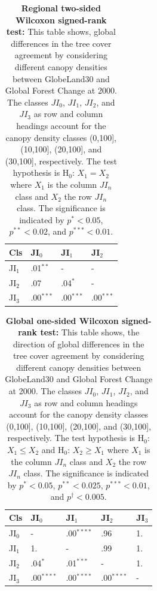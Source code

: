 			\begin{table}[ht]
				\centering
				\caption[Global two-sided Wilcoxon signed-rank test]{\textbf{Regional two-sided Wilcoxon signed-rank test:} This table shows, global differences in the tree cover agreement by considering different canopy densities between GlobeLand30 and Global Forest Change at 2000. The classes $JI_0$, $JI_1$, $JI_2$, and $JI_3$ as row and column headings account for the canopy density classes (0,100], (10,100], (20,100], and (30,100], respectively. The test hypothesis is H$_0$: $X_1=X_2$ where $X_1$ is the column $JI_n$ class and $X_2$ the row $JI_n$ class. The significance is indicated by $p^{*}<0.05$, $p^{**}<0.02$, and $p^{***}<0.01$.}
				\label{tab:wilcoxontwosided_all}
				\begin{tabular}{llll}
					\hline
					Cls & JI$_0$ & JI$_1$ & JI$_2$ \\\hline
					JI$_1$ & .01$^{**}$ & - & - \\
					JI$_2$ & .07 & .04$^{*}$ & - \\
					JI$_3$ & .00$^{***}$ & .00$^{***}$ & .00$^{***}$ \\\hline
				\end{tabular}
			\end{table}
			\begin{table}[ht]
				\centering
				\caption[Global one-sided Wilcoxon signed-rank test]{\textbf{Global one-sided Wilcoxon signed-rank test:} This table shows, the direction of global differences in the tree cover agreement by considering different canopy densities between GlobeLand30 and Global Forest Change at 2000. The classes $JI_0$, $JI_1$, $JI_2$, and $JI_3$ as row and column headings account for the canopy density classes (0,100], (10,100], (20,100], and (30,100], respectively. The test hypothesis is H$_0$: $X_1\leq X_2$ and H$_0$: $X_2\geq X_1$ where $X_1$ is the column $JI_n$ class and $X_2$ the row $JI_n$ class. The significance is indicated by $p^{*}<0.05$, $p^{**}<0.025$, $p^{***}<0.01$, and $p^{\dagger}<0.005$.}
				\label{tab:wilcoxononesided_all}
				\begin{tabular}{lllll}
					\hline
					Cls & JI$_0$ & JI$_1$ & JI$_2$ & JI$_3$ \\\hline
					JI$_0$ & - & .00$^{****}$ & .96 & 1. \\
					JI$_1$ & 1. & - & .99 & 1. \\
					JI$_2$ & .04$^{*}$ & .01$^{***}$ & - & 1. \\
					JI$_3$ & .00$^{****}$ & .00$^{****}$ & .00$^{****}$ & - \\\hline
				\end{tabular}
			\end{table}

